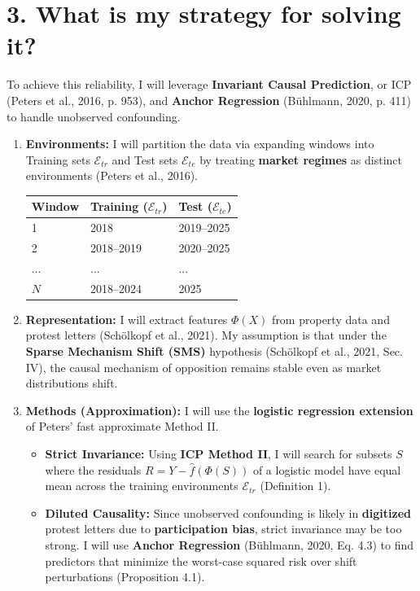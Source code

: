 \documentclass[11pt]{article}
\begin{document}
\section*{3. What is my strategy for solving it?}
To achieve this reliability, I will leverage \textbf{Invariant Causal Prediction}, or ICP (Peters et al., 2016, p. 953), %
and \textbf{Anchor Regression} (Bühlmann, 2020, p. 411) %
to handle unobserved confounding.
\begin{enumerate}
    \setlength\itemsep{-0.3em}
    \item \textbf{Environments:} I will partition the data via expanding windows into Training sets $\mathcal{E}_{tr}$ and Test sets $\mathcal{E}_{te}$ by treating \textbf{market regimes} as distinct environments (Peters et al., 2016).
    \begin{center}
    \scriptsize
    \begin{tabular}{l|l|l}
    \textbf{Window} & \textbf{Training ($\mathcal{E}_{tr}$)} & \textbf{Test ($\mathcal{E}_{te}$)} \\ \hline
    1 & 2018 & 2019--2025 \\
    2 & 2018--2019 & 2020--2025 \\
    ... & ... & ... \\
    $N$ & 2018--2024 & 2025
    \end{tabular}
    \end{center}
    \item \textbf{Representation:} I will extract features $\Phi(X)$ from property data and protest letters (Schölkopf et al., 2021). My assumption is that under the \textbf{Sparse Mechanism Shift (SMS)} hypothesis (Schölkopf et al., 2021, Sec. IV), the causal mechanism of opposition remains stable even as market distributions shift.
    \item \textbf{Methods (Approximation):} I will use the \textbf{logistic regression extension} of Peters' fast approximate Method II.
    \begin{itemize}
        \item \textbf{Strict Invariance:} Using \textbf{ICP Method II}, I will search for subsets $S$ where the residuals $R = Y - \hat{f}(\Phi(S))$ of a logistic model have equal mean across the training environments $\mathcal{E}_{tr}$ (Definition 1).
        \item \textbf{Diluted Causality:} Since unobserved confounding is likely in \textbf{digitized} protest letters due to \textbf{participation bias}, strict invariance may be too strong. I will use \textbf{Anchor Regression} (Bühlmann, 2020, Eq. 4.3)
        to find predictors that minimize the worst-case squared risk over shift perturbations (Proposition 4.1).
    \end{itemize}
\end{enumerate}
\end{document}
